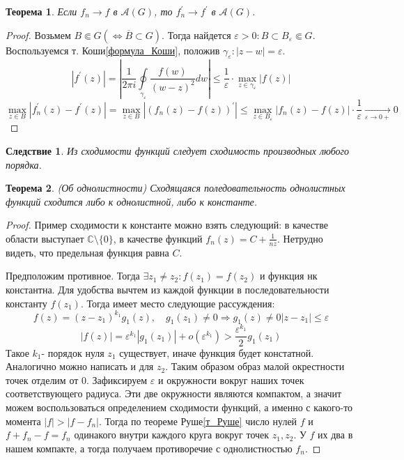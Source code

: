 \documentclass[12pt,a4paper]{article} %
\newtheorem{theorem}{Теорема}
\newtheorem{consequence}{Следствие}
\newcommand{\Co}{\mathbb{C}}
\begin{document}
	\begin{theorem}
		Если $f_n\rightarrow f$ в $\mathcal{A}(G)$, то $f_n^{'}\rightarrow f^{'}$ в $\mathcal{A}(G)$.
	\end{theorem}
	\begin{proof}
		Возьмем $B\Subset G(\Leftrightarrow\overline{B}\subset G)$. Тогда найдется $\varepsilon >0: B\subset B_{\varepsilon}\Subset G$. Воспользуемся т. Коши\eqref{формула_Коши}, положив $\gamma_{\varepsilon}: |z-w|=\varepsilon$.
		$$|f^{'}(z)|=\left|\frac{1}{2\pi i}\oint\limits_{\gamma_{\varepsilon}}\frac{f(w)}{(w-z)^2}dw\right|\leq\frac{1}{\varepsilon}\cdot\underset{z\in\gamma_{\varepsilon}}{\max}|f(z)|$$
		$$\underset{z\in B}{\max}|f_n^{'}(z)-f^{'}(z)|=\underset{z\in B}{\max}|(f_n(z)-f(z))^{'}|\leq\underset{z\in B_{\varepsilon}}{\max}|f_n(z)-f(z)|\cdot\frac{1}{\varepsilon}\underset{\varepsilon\rightarrow 0+}{\longrightarrow}0$$
	\end{proof}
	\begin{consequence}
		Из сходимости функций следует сходимость производных любого порядка.
	\end{consequence}
	\begin{theorem}\label{однолистноть_предел}
		(Об однолистности) Сходящаяся поледовательность однолистных функций сходится либо к однолистной, либо к константе.
	\end{theorem}
	\begin{proof}
		Пример сходимости к константе можно взять следующий: в качестве области выступает $\Co\setminus\{0\}$, в качестве функций $f_n(z)=C+\displaystyle\frac{1}{nz}$. Нетрудно видеть, что предельная функция равна $C$.
		
		Предположим противное. Тогда $\exists z_1\neq z_2:f(z_1)=f(z_2)$ и функция нк константна. Для удобства вычтем из каждой функции в последовательности константу $f(z_1)$. Тогда имеет место следующие рассуждения:
		$$f(z)=(z-z_1)^{k_1}g_1(z),\quad g_1(z_1)\neq 0\Rightarrow g_1(z)\neq 0 |z-z_1|\leq\varepsilon$$
		$$|f(z)|=\varepsilon^{k_1}|g_1(z_1)|+o(\varepsilon^{k_1})>\frac{\varepsilon^{k_1}}{2}g_1(z_1)$$
		Такое $k_1$- порядок нуля $z_1$ существует, иначе функция будет констатной. Аналогично можно написать и для $z_2$. Таким образом образ малой окрестности точек отделим от 0. Зафиксируем $\varepsilon$ и окружности вокруг наших точек соответствующего радиуса. Эти две окружности являются компактом, а значит можем воспользоваться определением сходимости функций, а именно с какого-то момента $|f|>|f-f_n|$. Тогда по теореме Руше\eqref{т_Руше} число нулей $f$ и $f+f_n-f=f_n$ одинакого внутри каждого круга вокруг точек $z_1,z_2$. У $f$ их два в нашем компакте, а тогда получаем противоречие с однолистностью $f_n$.
	\end{proof}
\end{document}
